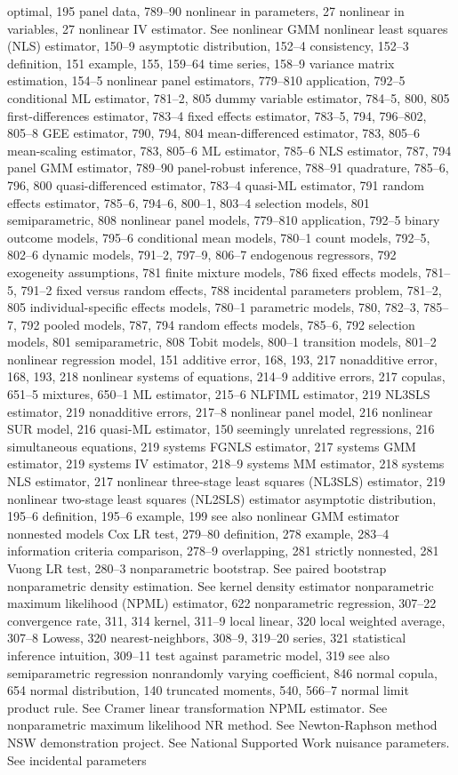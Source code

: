 optimal, 195
panel data, 789–90
nonlinear in parameters, 27
nonlinear in variables, 27
nonlinear IV estimator. See nonlinear GMM nonlinear least squares (NLS) estimator, 150–9
asymptotic distribution, 152–4 consistency, 152–3
definition, 151
example, 155, 159–64
time series, 158–9
variance matrix estimation, 154–5 nonlinear panel estimators, 779–810
application, 792–5
conditional ML estimator, 781–2, 805
dummy variable estimator, 784–5, 800, 805 first-differences estimator, 783–4
fixed effects estimator, 783–5, 794, 796–802, 805–8 GEE estimator, 790, 794, 804
mean-differenced estimator, 783, 805–6 mean-scaling estimator, 783, 805–6
ML estimator, 785–6
NLS estimator, 787, 794
panel GMM estimator, 789–90
panel-robust inference, 788–91
quadrature, 785–6, 796, 800
quasi-differenced estimator, 783–4
quasi-ML estimator, 791
random effects estimator, 785–6, 794–6, 800–1,
803–4
selection models, 801 semiparametric, 808
nonlinear panel models, 779–810 application, 792–5
binary outcome models, 795–6 conditional mean models, 780–1
count models, 792–5, 802–6
dynamic models, 791–2, 797–9, 806–7 endogenous regressors, 792 exogeneity assumptions, 781
finite mixture models, 786
fixed effects models, 781–5, 791–2
fixed versus random effects, 788
incidental parameters problem, 781–2, 805 individual-specific effects models, 780–1 parametric models, 780, 782–3, 785–7, 792 pooled models, 787, 794
random effects models, 785–6, 792 selection models, 801
semiparametric, 808
Tobit models, 800–1
transition models, 801–2
nonlinear regression model, 151 additive error, 168, 193, 217 nonadditive error, 168, 193, 218
nonlinear systems of equations, 214–9 additive errors, 217
copulas, 651–5
mixtures, 650–1
ML estimator, 215–6
NLFIML estimator, 219
NL3SLS estimator, 219
nonadditive errors, 217–8
nonlinear panel model, 216 nonlinear SUR model, 216 quasi-ML estimator, 150
seemingly unrelated regressions, 216 simultaneous equations, 219
systems FGNLS estimator, 217 systems GMM estimator, 219 systems IV estimator, 218–9 systems MM estimator, 218
systems NLS estimator, 217
nonlinear three-stage least squares (NL3SLS) estimator, 219
nonlinear two-stage least squares (NL2SLS) estimator asymptotic distribution, 195–6
definition, 195–6
example, 199
see also nonlinear GMM estimator nonnested models
Cox LR test, 279–80
definition, 278
example, 283–4
information criteria comparison, 278–9 overlapping, 281
strictly nonnested, 281
Vuong LR test, 280–3
nonparametric bootstrap. See paired bootstrap nonparametric density estimation. See kernel density
estimator
nonparametric maximum likelihood (NPML)
estimator, 622 nonparametric regression, 307–22
convergence rate, 311, 314 kernel, 311–9
local linear, 320
local weighted average, 307–8 Lowess, 320
nearest-neighbors, 308–9, 319–20 series, 321
statistical inference intuition, 309–11 test against parametric model, 319 see also semiparametric regression
nonrandomly varying coefficient, 846 normal copula, 654
normal distribution, 140
truncated moments, 540, 566–7
normal limit product rule. See Cramer linear
transformation
NPML estimator. See nonparametric maximum
likelihood
NR method. See Newton-Raphson method
NSW demonstration project. See National Supported
Work
nuisance parameters. See incidental parameters

